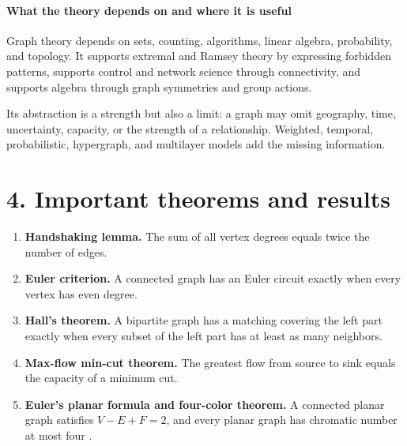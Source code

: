 \paragraph{What the theory depends on and where it is useful}
Graph theory depends on sets, counting, algorithms, linear algebra, probability, and topology. It supports extremal and Ramsey theory by expressing forbidden patterns, supports control and network science through connectivity, and supports algebra through graph symmetries and group actions.

Its abstraction is a strength but also a limit: a graph may omit geography, time, uncertainty, capacity, or the strength of a relationship. Weighted, temporal, probabilistic, hypergraph, and multilayer models add the missing information.

\section*{4. Important theorems and results}
\begin{enumerate}[leftmargin=*,itemsep=0.35em]
\item \textbf{Handshaking lemma.} The sum of all vertex degrees equals twice the number of edges.

\item \textbf{Euler criterion.} A connected graph has an Euler circuit exactly when every vertex has even degree.

\item \textbf{Hall's theorem.} A bipartite graph has a matching covering the left part exactly when every subset of the left part has at least as many neighbors.

\item \textbf{Max-flow min-cut theorem.} The greatest flow from source to sink equals the capacity of a minimum cut.

\item \textbf{Euler's planar formula and four-color theorem.} A connected planar graph satisfies $V-E+F=2$, and every planar graph has chromatic number at most four \cite{graph_theory_ref1}.
\end{enumerate}

\theoryapplications
{}
